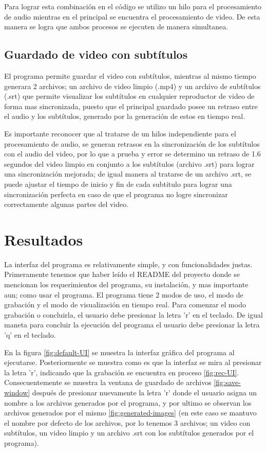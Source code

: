 \documentclass[conference]{IEEEtran}
\begin{document}
Para lograr esta combinación en el código se utilizo un hilo para el procesamiento de audio mientras en el principal se encuentra el procesamiento de video. De esta manera se logra que ambos procesos se ejecuten de manera simultanea. 

\subsection{Guardado de video con subtítulos}
El programa permite guardar el video con subtítulos, mientras al mismo tiempo generara 2 archivos; un archivo de video limpio (.mp4) y un archivo de subtítulos (.srt) que permite visualizar los subtítulos en cualquier reproductor de video de forma mas sincronizada, puesto que el principal guardado posee un retraso entre el audio y los subtítulos, generado por la generación de estos en tiempo real.

Es importante reconocer que al tratarse de un hilos independiente para el procesamiento de audio, se generan retrasos en la sincronización de los subtítulos con el audio del video, por lo que a prueba y error se determino un retraso de 1.6 segundos del video limpio en conjunto a los subtítulos (archivo .srt) para lograr una sincronización mejorada; de igual manera al tratarse de un archivo .srt, se puede ajustar el tiempo de inicio y fin de cada subtitulo para lograr una sincronización perfecta en caso de que el programa no logre sincronizar correctamente algunas partes del video.


\section{Resultados}
La interfaz del programa es relativamente simple, y con funcionalidades justas. Primeramente tenemos que haber leído el README del proyecto donde se mencionan los requerimientos del programa, su instalación, y mas importante aun; como usar el programa. El programa tiene 2 modos de uso, el modo de grabación y el modo de visualización en tiempo real. Para comenzar el modo grabación o concluirla, el usuario debe presionar la letra 'r' en el teclado. De igual maneta para concluir la ejecución del programa el usuario debe presionar la letra 'q' en el teclado.

En la figura \ref{fig:default-UI} se muestra la interfaz gráfica del programa al ejecutarse. Posteriormente se muestra como es que la interfaz se mira al presionar la letra 'r', indicando que la grabación se encuentra en proceso \ref{fig:rec-UI}. Consecuentemente se muestra la ventana de guardado de archivos \ref{fig:save-window} después de presionar nuevamente la letra 'r' donde el usuario asigna un nombre a los archivos generados por el programa, y por ultimo se observan los archivos generados por el mismo \ref{fig:generated-images} (en este caso se mantuvo el nombre por defecto de los archivos, por lo tenemos 3 archivos; un video con subtítulos, un video limpio y un archivo .srt con los subtítulos generados por el programa).
\end{document}
